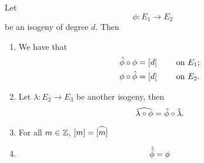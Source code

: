 \begin{theorem}
	\label{thm:dual-isogeny-properties}
	Let
	\begin{equation*}
		\phi: E_1 \to E_2
	\end{equation*}
	be an isogeny of degree $d$. Then 
	\begin{enumerate}[label=(\alph*), itemsep=0em]
		\item We have that
			\begin{align*}
				\Hat\phi \circ \phi &= [d] \qquad \textrm { on } E_1;\\
				\phi \circ \Hat\phi &= [d] \qquad \textrm { on } E_2.
			\end{align*}
		\item Let $\lambda: E_2 \to E_3$ be another isogeny, then
			\begin{equation*}
				\widehat{\lambda\circ\phi} = \Hat\phi \circ \Hat\lambda.
			\end{equation*}
		\item For all $m \in \mathbb{Z}$, $[m] = \widehat{[m]}$
		\item 
			\begin{equation*}
				\Hat{\Hat{\phi}} = \phi
			\end{equation*}
	\end{enumerate}
\end{theorem}

